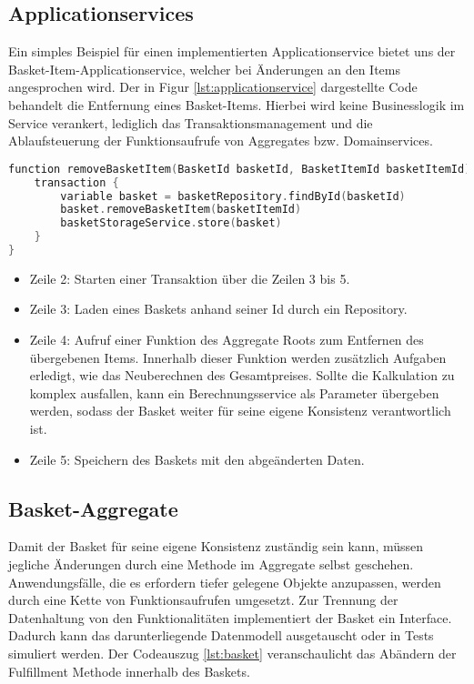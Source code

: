 \subsection{Applicationservices}

Ein simples Beispiel für einen implementierten Applicationservice bietet uns der Basket-Item-Applicationservice, welcher bei Änderungen an den Items angesprochen wird. Der in Figur \ref{lst:applicationservice} dargestellte Code behandelt die Entfernung eines Basket-Items. Hierbei wird keine Businesslogik im Service verankert, lediglich das Transaktionsmanagement und die Ablaufsteuerung der Funktionsaufrufe von Aggregates bzw. Domainservices.

\begin{minipage}{\linewidth} %
	\begin{lstlisting}[caption={Eine Beispielsfunktion des BasketItem-Applikationservice}, label={lst:applicationservice}, language=Kotlin]
function removeBasketItem(BasketId basketId, BasketItemId basketItemId) {
	transaction {
		variable basket = basketRepository.findById(basketId)
		basket.removeBasketItem(basketItemId)
		basketStorageService.store(basket)
	}
}
	\end{lstlisting}


	\begin{itemize}[noitemsep,nolistsep]
		\item Zeile 2: Starten einer Transaktion über die Zeilen 3 bis 5.
		\item Zeile 3: Laden eines Baskets anhand seiner Id durch ein Repository. 
		\item Zeile 4: Aufruf einer Funktion des Aggregate Roots zum Entfernen des übergebenen Items. Innerhalb dieser Funktion werden zusätzlich Aufgaben erledigt, wie das Neuberechnen des Gesamtpreises. Sollte die Kalkulation zu komplex ausfallen, kann ein Berechnungsservice als Parameter übergeben werden, sodass der Basket weiter für seine eigene Konsistenz verantwortlich ist. 
		\item Zeile 5: Speichern des Baskets mit den abgeänderten Daten.
	\end{itemize}
\end{minipage}

\subsection{Basket-Aggregate}

Damit der Basket für seine eigene Konsistenz zuständig sein kann, müssen jegliche Änderungen durch eine Methode im Aggregate selbst geschehen. Anwendungsfälle, die es erfordern tiefer gelegene Objekte anzupassen, werden durch eine Kette von Funktionsaufrufen umgesetzt. Zur Trennung der Datenhaltung von den Funktionalitäten implementiert der Basket ein Interface. Dadurch kann das darunterliegende Datenmodell ausgetauscht oder in Tests simuliert werden. Der Codeauszug \ref{lst:basket} veranschaulicht das Abändern der Fulfillment Methode innerhalb des Baskets.

